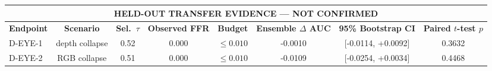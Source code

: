 \begin{tabular}{lccccccc}
\toprule
\multicolumn{8}{c}{\textbf{HELD-OUT TRANSFER EVIDENCE --- NOT CONFIRMED}} \\
\midrule
\textbf{Endpoint} & \textbf{Scenario} & \textbf{Sel.\ $\tau$} & \textbf{Observed FFR} & \textbf{Budget} & \textbf{Ensemble $\Delta$ AUC} & \textbf{95\% Bootstrap CI} & \textbf{Paired $t$-test $p$} \\
\midrule
D-EYE-1 & depth collapse & 0.52 & 0.000 & $\le 0.010$ & -0.0010 & [-0.0114, +0.0092] & 0.3632 \\
D-EYE-2 & RGB collapse & 0.51 & 0.000 & $\le 0.010$ & -0.0109 & [-0.0254, +0.0034] & 0.4468 \\
\bottomrule
\end{tabular}
